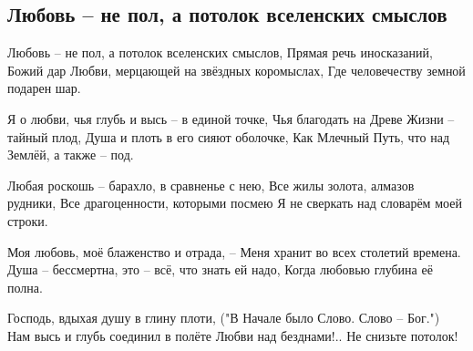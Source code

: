  
 
 
 
 
\subsection{Любовь – не пол, а потолок вселенских смыслов}
\label{sec:15_04_2021.fb.morits_junna.2.ljubov}

Любовь – не пол, а потолок вселенских смыслов,
Прямая речь иносказаний, Божий дар
Любви, мерцающей на звёздных коромыслах,
Где человечеству земной подарен шар.

Я о любви, чья глубь и высь – в единой точке,
Чья благодать на Древе Жизни – тайный плод,
Душа и плоть в его сияют оболочке,
Как Млечный Путь, что над Землёй, а также – под.

Любая роскошь – барахло, в сравненье с нею,
Все жилы золота, алмазов рудники,
Все драгоценности, которыми посмею
Я не сверкать над словарём моей строки.

Моя любовь, моё блаженство и отрада, –
Меня хранит во всех столетий времена.
Душа – бессмертна, это – всё, что знать ей надо,
Когда любовью глубина её полна.

Господь, вдыхая душу в глину плоти,
("В Начале было Слово. Слово – Бог.")
Нам высь и глубь соединил в полёте
Любви над безднами!.. Не снизьте потолок!


